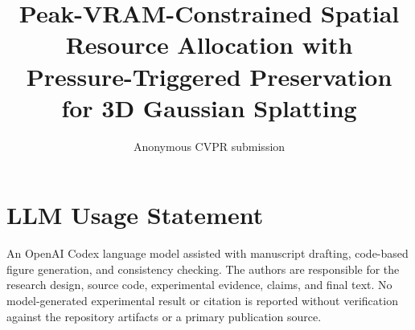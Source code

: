 \documentclass[10pt,twocolumn,letterpaper]{article}
\title{Peak-VRAM-Constrained Spatial Resource Allocation with\\Pressure-Triggered Preservation for 3D Gaussian Splatting}
\author{Anonymous CVPR submission}
\begin{document}
\maketitle










\clearpage
{\small


}

\section*{LLM Usage Statement}
An OpenAI Codex language model assisted with manuscript drafting, code-based figure generation, and consistency checking. The authors are responsible for the research design, source code, experimental evidence, claims, and final text. No model-generated experimental result or citation is reported without verification against the repository artifacts or a primary publication source.
\end{document}
